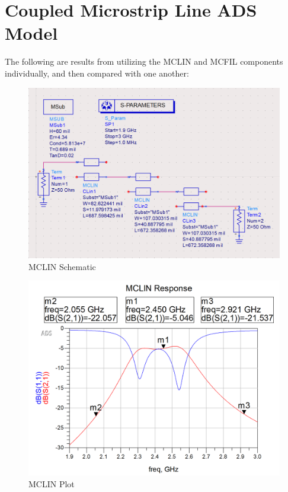 \documentclass{article}
\begin{document}
\newpage
\section{Coupled Microstrip Line ADS Model}
The following are results from utilizing the MCLIN and MCFIL components individually, and then compared with one another:
\begin{figure}[h!]
    \centering
    \includegraphics[scale=0.4]{images/mclin_schematic.png}
    \caption{MCLIN Schematic}
    \label{fig:10}
\end{figure}
\begin{figure}[h!]
    \centering
    \includegraphics[scale=0.3]{images/mclin_plot.png}
    \caption{MCLIN Plot}
    \label{fig:11}
\end{figure}
\end{document}
